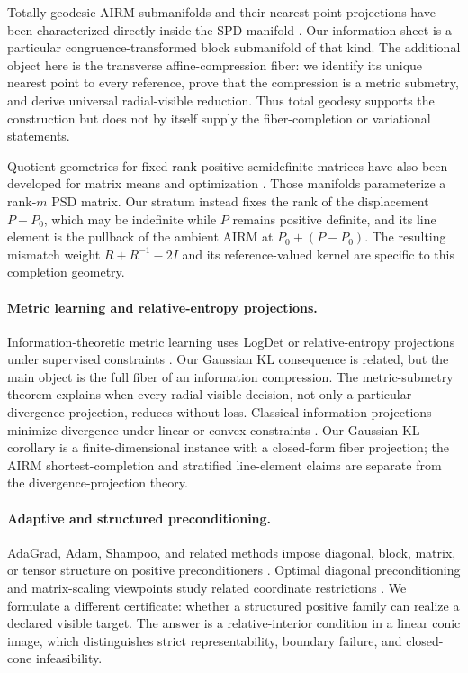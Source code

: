 \documentclass[10pt]{article}
\theoremstyle{plain}
\theoremstyle{definition}
\theoremstyle{remark}
\begin{document}
Totally geodesic AIRM submanifolds and their nearest-point projections have
been characterized directly inside the SPD manifold
\citep{tumpach2024totally}.  Our information sheet is a particular
congruence-transformed block submanifold of that kind.  The additional object
here is the transverse affine-compression fiber: we identify its unique
nearest point to every reference, prove that the compression is a metric
submetry, and derive universal radial-visible reduction.  Thus total geodesy
supports the construction but does not by itself supply the fiber-completion
or variational statements.

Quotient geometries for fixed-rank positive-semidefinite matrices have also
been developed for matrix means and optimization
\citep{bonnabel2010fixedrank,vandereycken2013fixedrank,massart2020quotient}.
Those manifolds parameterize a rank-\(m\) PSD matrix.  Our stratum instead
fixes the rank of the displacement \(P-P_0\), which may be indefinite while
\(P\) remains positive definite, and its line element is the pullback of the
ambient AIRM at \(P_0+(P-P_0)\).  The resulting mismatch weight
\(R+R^{-1}-2I\) and its reference-valued kernel are specific to this
completion geometry.

\paragraph{Metric learning and relative-entropy projections.}
Information-theoretic metric learning uses LogDet or relative-entropy
projections under supervised constraints \citep{davis2007information}.  Our
Gaussian KL consequence is related, but the main object is the full fiber of
an information compression.  The metric-submetry theorem explains when every
radial visible decision, not only a particular divergence projection, reduces
without loss.  Classical information projections minimize divergence under
linear or convex constraints
\citep{csiszar1975idivergence,csiszar2003projections}.  Our Gaussian KL
corollary is a finite-dimensional instance with a closed-form fiber
projection; the AIRM shortest-completion and stratified line-element claims
are separate from the divergence-projection theory.

\paragraph{Adaptive and structured preconditioning.}
AdaGrad, Adam, Shampoo, and related methods impose diagonal, block, matrix, or
tensor structure on positive preconditioners
\citep{duchi2011adagrad,kingma2014adam,gupta2018shampoo,morwani2024shampoo}.
Optimal diagonal preconditioning and matrix-scaling viewpoints study related
coordinate restrictions \citep{qu2025optimaldiagonal}.  We formulate a
different certificate: whether a structured positive family can realize a
declared visible target.  The answer is a relative-interior condition in a
linear conic image, which distinguishes strict representability, boundary
failure, and closed-cone infeasibility.
\end{document}
